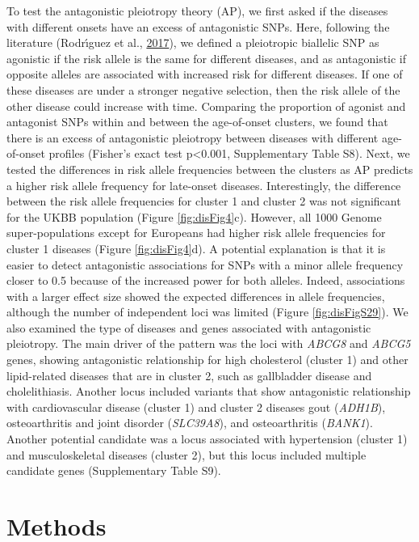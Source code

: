 \documentclass[12pt,twoside]{unicam}
\begin{document}
To test the antagonistic pleiotropy theory (AP), we first asked if the diseases with different onsets have an excess of antagonistic SNPs. Here, following the literature (Rodrı́guez et al., \protect\hyperlink{ref-Rodriguez2017}{2017}), we defined a pleiotropic biallelic SNP as agonistic if the risk allele is the same for different diseases, and as antagonistic if opposite alleles are associated with increased risk for different diseases. If one of these diseases are under a stronger negative selection, then the risk allele of the other disease could increase with time. Comparing the proportion of agonist and antagonist SNPs within and between the age-of-onset clusters, we found that there is an excess of antagonistic pleiotropy between diseases with different age-of-onset profiles (Fisher's exact test p\textless0.001, Supplementary Table S8). Next, we tested the differences in risk allele frequencies between the clusters as AP predicts a higher risk allele frequency for late-onset diseases. Interestingly, the difference between the risk allele frequencies for cluster 1 and cluster 2 was not significant for the UKBB population (Figure \ref{fig:disFig4}c). However, all 1000 Genome super-populations except for Europeans had higher risk allele frequencies for cluster 1 diseases (Figure \ref{fig:disFig4}d). A potential explanation is that it is easier to detect antagonistic associations for SNPs with a minor allele frequency closer to 0.5 because of the increased power for both alleles. Indeed, associations with a larger effect size showed the expected differences in allele frequencies, although the number of independent loci was limited (Figure \ref{fig:disFigS29}). We also examined the type of diseases and genes associated with antagonistic pleiotropy. The main driver of the pattern was the loci with \emph{ABCG8} and \emph{ABCG5} genes, showing antagonistic relationship for high cholesterol (cluster 1) and other lipid-related diseases that are in cluster 2, such as gallbladder disease and cholelithiasis. Another locus included variants that show antagonistic relationship with cardiovascular disease (cluster 1) and cluster 2 diseases gout (\emph{ADH1B}), osteoarthritis and joint disorder (\emph{SLC39A8}), and osteoarthritis (\emph{BANK1}). Another potential candidate was a locus associated with hypertension (cluster 1) and musculoskeletal diseases (cluster 2), but this locus included multiple candidate genes (Supplementary Table S9).

\hypertarget{methods}{%
\section{Methods}\label{methods}}
\end{document}
